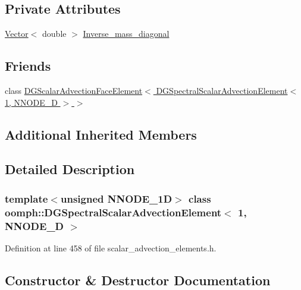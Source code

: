 \subsection*{Private Attributes}
\begin{DoxyCompactItemize}
\item 
\hyperlink{classoomph_1_1Vector}{Vector}$<$ double $>$ \hyperlink{classoomph_1_1DGSpectralScalarAdvectionElement_3_011_00_01NNODE__1D_01_4_a330e72eb72656497739be617dac1986b}{Inverse\+\_\+mass\+\_\+diagonal}
\end{DoxyCompactItemize}
\subsection*{Friends}
\begin{DoxyCompactItemize}
\item 
class \hyperlink{classoomph_1_1DGSpectralScalarAdvectionElement_3_011_00_01NNODE__1D_01_4_a6497c3da7e48fdfe0592526345654352}{D\+G\+Scalar\+Advection\+Face\+Element$<$ D\+G\+Spectral\+Scalar\+Advection\+Element$<$ 1, N\+N\+O\+D\+E\+\_\+D $>$ $>$}
\end{DoxyCompactItemize}
\subsection*{Additional Inherited Members}


\subsection{Detailed Description}
\subsubsection*{template$<$unsigned N\+N\+O\+D\+E\+\_\+1D$>$\newline
class oomph\+::\+D\+G\+Spectral\+Scalar\+Advection\+Element$<$ 1, N\+N\+O\+D\+E\+\_\+D $>$}



Definition at line 458 of file scalar\+\_\+advection\+\_\+elements.\+h.



\subsection{Constructor \& Destructor Documentation}
\mbox{\label{classoomph_1_1DGSpectralScalarAdvectionElement_3_011_00_01NNODE__1D_01_4_a15a0f59b87fb1eb728ba943b52509ed2}} 
